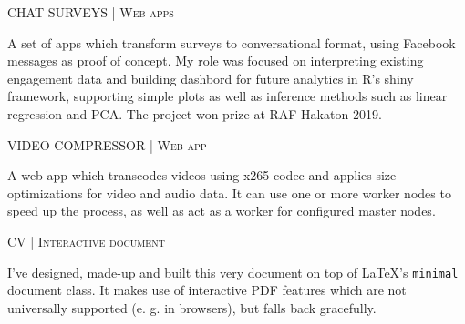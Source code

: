 %
\begin{minipage}[t]{\linewidth}\vspace{\subsectionSpace}
{\subtitleFont\bold CHAT SURVEYS \extraLight\scshape| Web apps \href{https://github.com/Runtime-T-error}{\faGithub}}\newline

\vspace{\ribbonTopMargin}
\ribbonR \ribbonTidyverse \ribbonPostgres \ribbonJava \ribbonSpringBoot\newline
\vspace{\ribbonBottomMargin}

{\contentFont A set of apps which transform surveys to conversational format, using Facebook messages as proof of concept. My role was focused on interpreting existing engagement data and building dashbord for future analytics in R's shiny framework, supporting simple plots as well as inference methods such as linear regression and PCA. The project won  prize at RAF Hakaton 2019.}
\end{minipage}\newline%
%
\begin{minipage}[t]{\linewidth}\vspace{\subsectionSpace}
{\subtitleFont\bold VIDEO COMPRESSOR \extraLight\scshape| Web app \href{https://github.com/luka-j/MediaCompressor}{\faGithub} \href{https://compressor.luka-j.rocks/}{\faGlobe}}\newline

\vspace{\ribbonTopMargin}
\ribbonKotlin \ribbonSpringBoot \ribbonPostgres \ribbonFfmpeg\newline
\vspace{\ribbonBottomMargin}

{\contentFont A web app which transcodes videos using x265 codec and applies size optimizations for video and audio data. It can use one or more worker nodes to speed up the process, as well as act as a worker for configured master nodes.}
\end{minipage}\newline%
%
\begin{minipage}[t]{\linewidth}\vspace{\subsectionSpace}
{\subtitleFont\bold CV \extraLight\scshape| Interactive document \href{https://github.com/luka-j/CV/tree/latex-v3}{\faGithub}}\newline

\vspace{\ribbonTopMargin}
\ribbonLatex \ribbonFontAwesome \newline
\vspace{\ribbonBottomMargin}

{\contentFont I've designed, made-up and built this very document on top of \LaTeX's \texttt{minimal} document class. It makes use of interactive PDF features which are not universally supported (e. g. in browsers), but falls back gracefully.}
\end{minipage}\newline